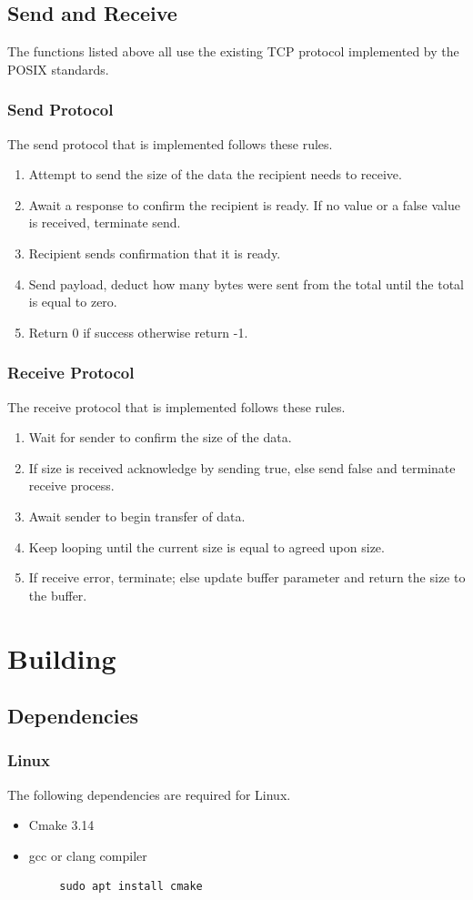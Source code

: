 \documentclass{article}
\begin{document}
\subsection{Send and Receive}
The functions listed above all use the existing TCP protocol implemented by the POSIX standards.
\subsubsection{Send Protocol}
The send protocol that is implemented follows these rules.
\begin{enumerate}
    \item Attempt to send the size of the data the recipient needs to receive.
    \item Await a response to confirm the recipient is ready. If no value or a false value is received, terminate send.
    \item Recipient sends confirmation that it is ready.
    \item Send payload, deduct how many bytes were sent from the total until the total is equal to zero.
    \item Return 0 if success otherwise return -1.
\end{enumerate}
\subsubsection{Receive Protocol}
The receive protocol that is implemented follows these rules.
\begin{enumerate}
    \item Wait for sender to confirm the size of the data.
    \item If size is received acknowledge by sending true, else send false and terminate receive process.
    \item Await sender to begin transfer of data.
    \item Keep looping until the current size is equal to agreed upon size.
    \item If receive error, terminate; else update buffer parameter and return the size to the buffer.
\end{enumerate}
\section{Building}
\subsection{Dependencies}
\subsubsection*{Linux}
The following dependencies are required for Linux.
\begin{itemize}
    \item Cmake 3.14
    \item gcc or clang compiler
\end{itemize}
\begin{lstlisting}
        sudo apt install cmake
\end{lstlisting}
\end{document}
